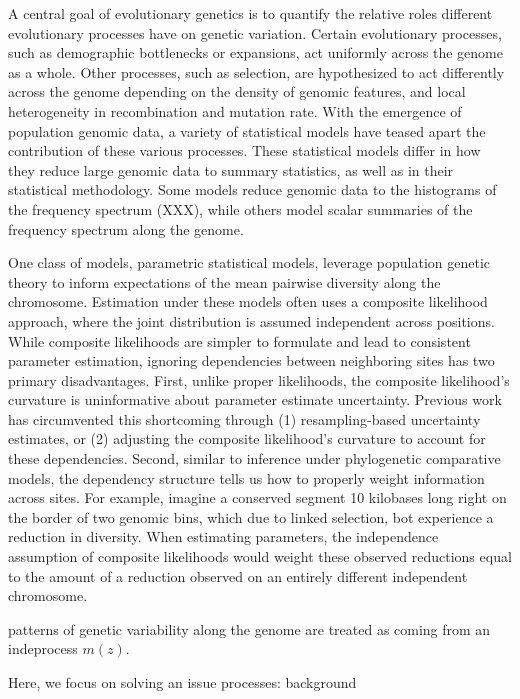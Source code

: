 \documentclass[11pt]{article}
\title{}
\author{Vince Buffalo and Andrew Kern}
\begin{document}
\maketitle

A central goal of evolutionary genetics is to quantify the relative roles
different evolutionary processes have on genetic variation. Certain
evolutionary processes, such as demographic bottlenecks or expansions, act
uniformly across the genome as a whole. Other processes, such as selection, are
hypothesized to act differently across the genome depending on the density of
genomic features, and local heterogeneity in recombination and mutation rate.
With the emergence of population genomic data, a variety of statistical models
have teased apart the contribution of these various processes. These
statistical models differ in how they reduce large genomic data to summary
statistics, as well as in their statistical methodology. Some models reduce
genomic data to the histograms of the frequency spectrum (XXX), while others
model scalar summaries of the frequency spectrum along the genome. 

One class of models, parametric statistical models, leverage population genetic
theory to inform expectations of the mean pairwise diversity along the
chromosome. Estimation under these models often uses a composite likelihood
approach, where the joint distribution is assumed independent across positions.
While composite likelihoods are simpler to formulate and lead to consistent
parameter estimation, ignoring dependencies between neighboring sites has two
primary disadvantages. First, unlike proper likelihoods, the composite
likelihood's curvature is uninformative about parameter estimate uncertainty.
Previous work has circumvented this shortcoming through (1) resampling-based
uncertainty estimates, or (2) adjusting the composite likelihood's curvature to
account for these dependencies. Second, similar to inference under phylogenetic
comparative models, the dependency structure tells us how to properly weight
information across sites. For example, imagine a conserved segment 10 kilobases
long right on the border of two genomic bins, which due to linked selection,
bot experience a reduction in diversity. When estimating parameters, the
independence assumption of composite likelihoods would weight these observed
reductions equal to the amount of a reduction observed on an entirely different
independent chromosome. 

patterns of genetic variability along the genome are treated as
coming from an indeprocess $m(z)$.


Here, we focus on solving an issue processes: background




\printbibliography
\end{document}
